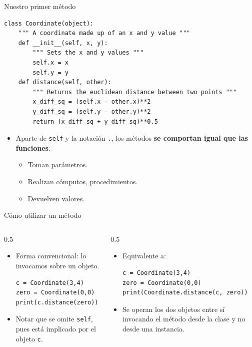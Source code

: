 \documentclass[mathserif]{beamer}
\begin{document}
\begin{frame}[fragile]{Nuestro primer método}
\begin{lstlisting}
class Coordinate(object):
    """ A coordinate made up of an x and y value """
    def __init__(self, x, y):
        """ Sets the x and y values """
        self.x = x
        self.y = y
    def distance(self, other):
        """ Returns the euclidean distance between two points """
        x_diff_sq = (self.x - other.x)**2
        y_diff_sq = (self.y - other.y)**2
        return (x_diff_sq + y_diff_sq)**0.5
\end{lstlisting}
    \begin{itemize}
        \item Aparte de \lstinline|self| y la notación \lstinline|.|, los métodos {\orange\bfseries se comportan igual que las funciones}.
        \begin{itemize}
            \item Toman parámetros.
            \item Realizan cómputos, procedimientos. 
            \item Devuelven valores.
        \end{itemize}
    \end{itemize}
    
\end{frame}

\begin{frame}[fragile]{Cómo utilizar un método}
    \begin{columns}
        \begin{column}{0.5\textwidth}
        \begin{itemize}
            \item Forma convencional: lo invocamos sobre un objeto.
\begin{lstlisting}
c = Coordinate(3,4)
zero = Coordinate(0,0)
print(c.distance(zero))
\end{lstlisting}
            \item Notar que se omite \lstinline|self|, pues está implicado por el objeto \lstinline|c|.
        \end{itemize}
        \end{column}
        \begin{column}{0.5\textwidth}
        \begin{itemize}
            \item Equivalente a:
\begin{lstlisting}
c = Coordinate(3,4)
zero = Coordinate(0,0)
print(Coordinate.distance(c, zero))
\end{lstlisting}
            \item Se operan los dos objetos entre sí invocando el método {\blue desde la clase} y no desde una instancia.
        \end{itemize}
        \end{column}
    \end{columns}
\end{frame}
\end{document}
